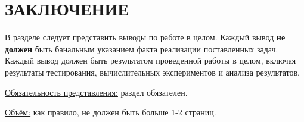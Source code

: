 \chapter*{ЗАКЛЮЧЕНИЕ}\label{chap_conclusion}

В разделе следует представить выводы по работе в целом.
Каждый вывод \textbf{не должен} быть банальным указанием факта реализации поставленных задач.
Каждый вывод должен быть результатом проведенной работы в целом, включая результаты тестирования, вычислительных экспериментов и анализа результатов.

\underline{Обязательность представления:} раздел обязателен. 

\underline{Объём:} как правило, не должен быть больше 1-2 страниц.

